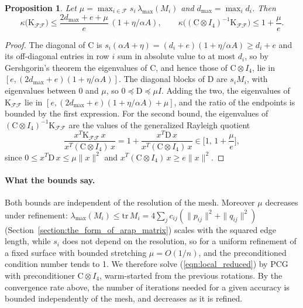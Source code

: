\documentclass{birkjour}
\newtheorem{prop}[thm]{Proposition}
\theoremstyle{remark}
\numberwithin{equation}{section}
\begin{document}
\begin{prop}
\label{prop:conditioning}
Let $\mu = \max_{i \in \mathcal F} s_i \, \lambda_{\max}(M_i)$ and $d_{\max} = \max_i d_i$. Then
\begin{equation*}
\kappa\big(\mathrm K_{\mathcal F \mathcal F}\big) \leq \frac{2 d_{\max} + e + \mu}{e} \, (1 + \eta / \alpha A),
\qquad
\kappa\big((\mathrm C \otimes I_4)^{-1} \mathrm K_{\mathcal F \mathcal F}\big) \leq 1 + \frac{\mu}{e}.
\end{equation*}
\end{prop}
\begin{proof}
The diagonal of $\mathrm C$ is $s_i (\alpha A + \eta) = (d_i + e)(1 + \eta / \alpha A) \geq d_i + e$ and its off-diagonal entries in row $i$ sum in absolute value to at most $d_i$, so by Gershgorin's theorem the eigenvalues of $\mathrm C$, and hence those of $\mathrm C \otimes I_4$, lie in $[e, (2 d_{\max} + e)(1 + \eta / \alpha A)]$. The diagonal blocks of $\mathrm D$ are $s_i M_i$, with eigenvalues between $0$ and $\mu$, so $0 \preceq \mathrm D \preceq \mu I$. Adding the two, the eigenvalues of $\mathrm K_{\mathcal F \mathcal F}$ lie in $[e, (2 d_{\max} + e)(1 + \eta / \alpha A) + \mu]$, and the ratio of the endpoints is bounded by the first expression. For the second bound, the eigenvalues of $(\mathrm C \otimes I_4)^{-1} \mathrm K_{\mathcal F \mathcal F}$ are the values of the generalized Rayleigh quotient
\begin{equation*}
\frac{x^T \mathrm K_{\mathcal F \mathcal F} \, x}{x^T (\mathrm C \otimes I_4) \, x} = 1 + \frac{x^T \mathrm D \, x}{x^T (\mathrm C \otimes I_4) \, x} \in \Big[ 1, \, 1 + \frac{\mu}{e} \Big],
\end{equation*}
since $0 \leq x^T \mathrm D \, x \leq \mu \|x\|^2$ and $x^T (\mathrm C \otimes I_4) \, x \geq e \|x\|^2$.
\end{proof}

\paragraph{What the bounds say.} Both bounds are independent of the resolution of the mesh. Moreover $\mu$ decreases under refinement: $\lambda_{\max}(M_i) \leq \mathrm{tr}\, M_i = 4 \sum_j c_{ij} (\|p_{ij}\|^2 + \|q_{ij}\|^2)$ (Section~\ref{section:the_form_of_arap_matrix}) scales with the squared edge length, while $s_i$ does not depend on the resolution, so for a uniform refinement of a fixed surface with bounded stretching $\mu = O(1/n)$, and the preconditioned condition number tends to 1. We therefore solve (\ref{eqn:local_reduced}) by PCG with preconditioner $\mathrm C \otimes I_4$, warm-started from the previous rotations. By the convergence rate above, the number of iterations needed for a given accuracy is bounded independently of the mesh, and decreases as it is refined.
\end{document}
